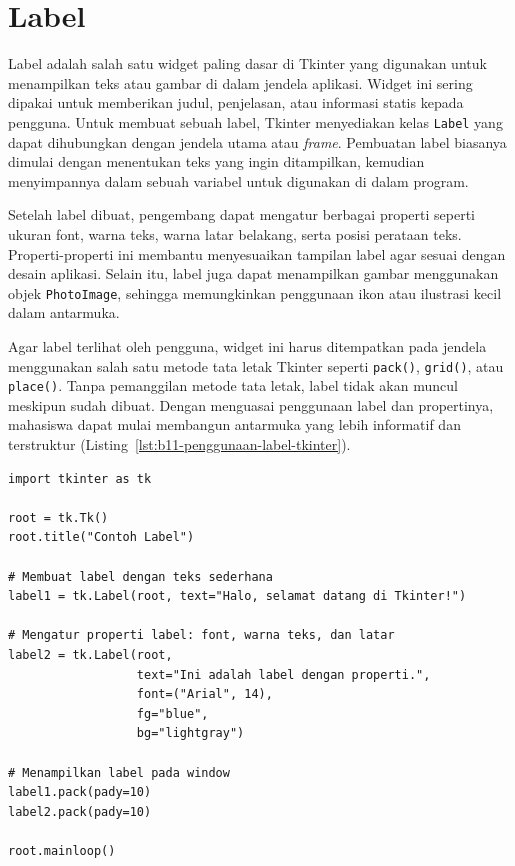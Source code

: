 \section{Label}

Label adalah salah satu widget paling dasar di Tkinter yang digunakan untuk menampilkan teks atau gambar di dalam jendela aplikasi. Widget ini sering dipakai untuk memberikan judul, penjelasan, atau informasi statis kepada pengguna. Untuk membuat sebuah label, Tkinter menyediakan kelas \texttt{Label} yang dapat dihubungkan dengan jendela utama atau \textit{frame}. Pembuatan label biasanya dimulai dengan menentukan teks yang ingin ditampilkan, kemudian menyimpannya dalam sebuah variabel untuk digunakan di dalam program.

Setelah label dibuat, pengembang dapat mengatur berbagai properti seperti ukuran font, warna teks, warna latar belakang, serta posisi perataan teks. Properti-properti ini membantu menyesuaikan tampilan label agar sesuai dengan desain aplikasi. Selain itu, label juga dapat menampilkan gambar menggunakan objek \texttt{PhotoImage}, sehingga memungkinkan penggunaan ikon atau ilustrasi kecil dalam antarmuka.

Agar label terlihat oleh pengguna, widget ini harus ditempatkan pada jendela menggunakan salah satu metode tata letak Tkinter seperti \texttt{pack()}, \texttt{grid()}, atau \texttt{place()}. Tanpa pemanggilan metode tata letak, label tidak akan muncul meskipun sudah dibuat. Dengan menguasai penggunaan label dan propertinya, mahasiswa dapat mulai membangun antarmuka yang lebih informatif dan terstruktur (Listing~\ref{lst:b11-penggunaan-label-tkinter}).

\begin{lstlisting}[style=PythonStyle, caption={Contoh Penggunaan Label di Tkinter}, label={lst:b11-penggunaan-label-tkinter}]
import tkinter as tk

root = tk.Tk()
root.title("Contoh Label")

# Membuat label dengan teks sederhana
label1 = tk.Label(root, text="Halo, selamat datang di Tkinter!")

# Mengatur properti label: font, warna teks, dan latar
label2 = tk.Label(root,
                  text="Ini adalah label dengan properti.",
                  font=("Arial", 14),
                  fg="blue",
                  bg="lightgray")

# Menampilkan label pada window
label1.pack(pady=10)
label2.pack(pady=10)

root.mainloop()
\end{lstlisting}

